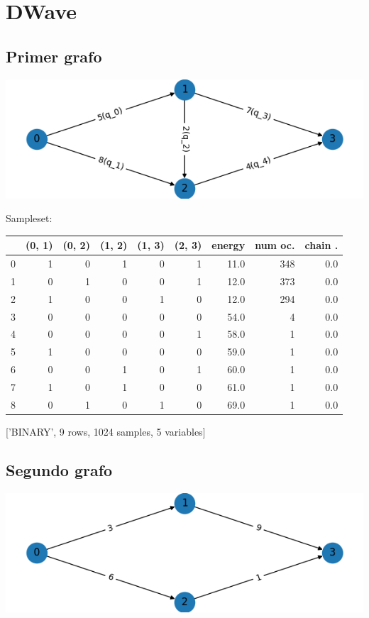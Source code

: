 \documentclass[letterpaper]{article}
\begin{document}
\section{DWave}
\label{sec:org9046823}
\subsection{Primer grafo}
\label{sec:orgbd89526}
\begin{center}
\includegraphics[width=.9\linewidth]{./img/primer_grafo/primer_grafo.png}
\end{center}

Sampleset:
\begin{center}
\begin{tabular}{|r|r|r|r|r|r|r|r|r|}
\hline
 & (0, 1) & (0, 2) & (1, 2) & (1, 3) & (2, 3) & energy & num oc. & chain .\\
\hline
0 & 1 & 0 & 1 & 0 & 1 & 11.0 & 348 & 0.0\\
1 & 0 & 1 & 0 & 0 & 1 & 12.0 & 373 & 0.0\\
2 & 1 & 0 & 0 & 1 & 0 & 12.0 & 294 & 0.0\\
3 & 0 & 0 & 0 & 0 & 0 & 54.0 & 4 & 0.0\\
4 & 0 & 0 & 0 & 0 & 1 & 58.0 & 1 & 0.0\\
5 & 1 & 0 & 0 & 0 & 0 & 59.0 & 1 & 0.0\\
6 & 0 & 0 & 1 & 0 & 1 & 60.0 & 1 & 0.0\\
7 & 1 & 0 & 1 & 0 & 0 & 61.0 & 1 & 0.0\\
8 & 0 & 1 & 0 & 1 & 0 & 69.0 & 1 & 0.0\\
\hline
\end{tabular}
\end{center}
['BINARY', 9 rows, 1024 samples, 5 variables]

\newpage
\subsection{Segundo grafo}
\label{sec:org8e18535}
\begin{center}
\includegraphics[width=.9\linewidth]{./img/segundo_grafo.png}
\end{center}
\end{document}
